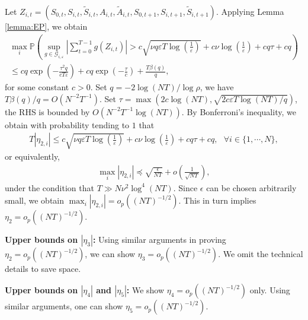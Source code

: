 \documentclass{article}
\newcommand{\prob}{{\mathbb{P}}}
\begin{document}
Let $Z_{i,t}=(S_{0,t},S_{i,t},\widetilde{S}_{i,t},A_{i,t},\widetilde{A}_{i,t},S_{0,t+1},S_{i,t+1},\widetilde{S}_{i,t+1})$. Applying Lemma \ref{lemma:EP}, we obtain 
	\begin{eqnarray*}
	\max_i \prob\left(\sup_{g\in \mathcal{G}_{i,\varepsilon}}\left|\sum_{t=0}^{T-1} g(Z_{i,t})\right|>c\sqrt{\nu q\varepsilon T \log \left(\frac{1}{\varepsilon}\right)}+c\nu \log \left(\frac{1}{\varepsilon}\right)+c q\tau+c q\right)\\
	\le c q\exp\left(-\frac{\tau^2q}{cT\varepsilon }\right)+cq\exp\left(-\frac{\tau}{c}\right)+\frac{T\beta(q)}{q},
\end{eqnarray*}
for some constant $c>0$. Set $q=-2\log (NT)/\log \rho$, we have $T\beta(q)/q=O(N^{-2} T^{-1})$. Set $\tau=\max(2c\log (NT), \sqrt{2c\varepsilon T\log (NT)/q})$, the RHS is bounded by $O(N^{-2} T^{-1} \log (NT))$. By Bonferroni's inequality, we obtain with probability tending to $1$ that
\begin{eqnarray*}
	T|\eta_{2,i}|\le c\sqrt{\nu q\varepsilon T \log \left(\frac{1}{\varepsilon}\right)}+c\nu \log \left(\frac{1}{\varepsilon}\right)+c q\tau+c q,\,\,\,\,\forall i\in \{1,\cdots,N\},
\end{eqnarray*}
or equivalently,
\begin{eqnarray*}
	\max_i |\eta_{2,i}|\preceq \sqrt{\frac{\epsilon}{NT}}+o\left(\frac{1}{\sqrt{NT}}\right),
\end{eqnarray*}
under the condition that $T\gg N \nu^2 \log^4 (NT)$. Since $\epsilon$ can be chosen arbitrarily small, we obtain $\max_i |\eta_{2,i}|=o_p((NT)^{-1/2})$. This in turn implies $\eta_2=o_p((NT)^{-1/2})$.

\textbf{Upper bounds on $|\eta_3|$: }Using similar arguments in proving $\eta_2=o_p((NT)^{-1/2})$, we can show $\eta_3=o_p((NT)^{-1/2})$. We omit the technical details to save space. 

\textbf{Upper bounds on $|\eta_4|$ and $|\eta_5|$: }We show $\eta_4=o_p((NT)^{-1/2})$ only. Using similar arguments, one can show $\eta_5=o_p((NT)^{-1/2})$. 
\end{document}
